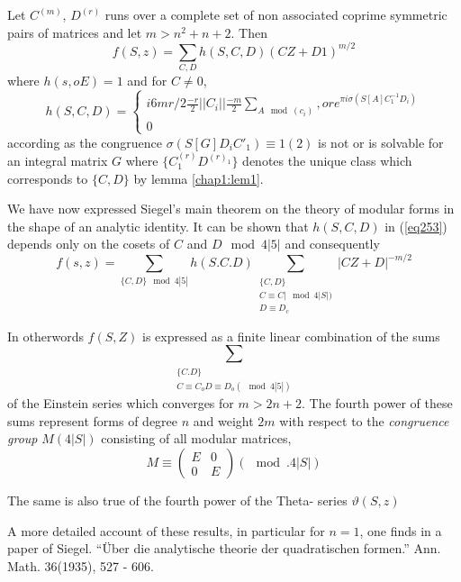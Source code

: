 \begin{thm}\label{chap13:thm18} %
 Let $C^{(m)}$, $D ^{(r)}$ runs over a complete set of non
  associated coprime symmetric pairs of matrices and let $m > n^2 + n
  + 2$. Then 
 \begin{equation*}
f (S, z) = \sum_{ C , D} h ( S, C , D) (C Z +D1)^{ m / 2}
\tag{253}\label{eq253}    
 \end{equation*} 
 where $h (s, o E) = 1 $ and for $C \neq 0$, 
 \begin{equation*}
h ( S, C, D) = 
\begin{cases}
 i 6{mr /2} \frac{- r}{2} || C_i || \frac{-m}{2}\sum_{ A \mod (c_i )},
 or e^{ \pi i \sigma (S[A]C_1^{-1}D_i) }\\ 
 0 \tag{254}\label{eq254}
 \end{cases}
 \end{equation*} 
according as the congruence $\sigma (S [G] D_i C'_1) \equiv 1(2)$ is
not or is solvable for an integral matrix $G$ where $\big\{ C^{(r)}_1
D^{(r)_1}\big \}$ denotes the unique class which corresponds to
$\big\{ C, D\big\}$ by lemma \ref{chap1:lem1}.  
\end{thm}

We have now expressed Siegel's main theorem on the theory of modular
forms in the shape of an analytic identity. It can be shown that $ h
(S, C ,D )$ in (\ref{eq253}) depends only on the cosets of $C$ and $D \mod 4
|5|$ and consequently  
$$
f (s , z ) = \sum_{\{ C, D\} \mod 4 |5|} h (S. C. D) \sum_{\substack{
    \{ C, D\}\\ C \equiv C |\mod 4 |S|) \\ D \equiv D_c }} | C Z +
D|^{ -m / 2} 
$$

In other\pageoriginale words $f (S, Z)$ is expressed as a finite
linear combination of the sums   
$$
\sum_{ \substack{ \{C. D \} \\ C \equiv C_o D \equiv D_o(\mod 4|5|)}} 
$$
of the Einstein series which converges for $m > 2 n +2$. The fourth
power of these sums represent forms of degree $n $ and weight $2m$
with respect to the \textit{ congruence group } $M ( 4 |S|)$
consisting of all modular matrices,  
$$
M \equiv 
\left (
\begin{smallmatrix}
 E & 0\\ 0 & E 
\end{smallmatrix} 
\right )
(\mod . 4 |S|)
$$
 
The same is also true of the fourth power of the Theta- series
$\vartheta (S, z)$ 

A more detailed account of these results, in particular for $ n = 1$,
one finds in a paper of Siegel. ``\"Uber die analytische theorie der
quadratischen formen.'' Ann. Math. 36(1935), 527 - 606.  

